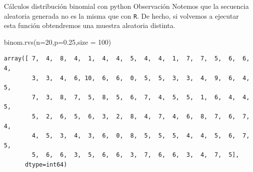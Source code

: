 \documentclass[
  ignorenonframetext,
  aspectratio=169]{beamer}
\newenvironment{Shaded}{\begin{snugshade}}{\end{snugshade}}
\newcommand{\DecValTok}[1]{\textcolor[rgb]{0.68,0.00,0.00}{#1}}
\newcommand{\FloatTok}[1]{\textcolor[rgb]{0.68,0.00,0.00}{#1}}
\newcommand{\NormalTok}[1]{\textcolor[rgb]{0.00,0.23,0.31}{#1}}
\newcommand{\OperatorTok}[1]{\textcolor[rgb]{0.37,0.37,0.37}{#1}}
\begin{document}
\begin{frame}[fragile]{Cálculos distribución binomial con python}
\protect\hypertarget{cuxe1lculos-distribuciuxf3n-binomial-con-python-4}{}
Observación Notemos que la secuencia aleatoria generada no es la misma
que con \texttt{R}. De hecho, si volvemos a ejecutar esta función
obtendremos una muestra aleatoria distinta.

\begin{Shaded}
\begin{Highlighting}[]
\NormalTok{binom.rvs(n}\OperatorTok{=}\DecValTok{20}\NormalTok{,p}\OperatorTok{=}\FloatTok{0.25}\NormalTok{,size }\OperatorTok{=} \DecValTok{100}\NormalTok{)}
\end{Highlighting}
\end{Shaded}

\begin{verbatim}
array([ 7,  4,  8,  4,  1,  4,  4,  5,  4,  4,  1,  7,  7,  5,  6,  6,  4,
        3,  3,  4,  6, 10,  6,  6,  0,  5,  5,  3,  3,  4,  9,  6,  4,  5,
        7,  3,  8,  7,  5,  8,  5,  6,  7,  4,  5,  5,  1,  6,  4,  4,  5,
        5,  2,  6,  5,  6,  3,  2,  8,  4,  7,  4,  6,  8,  7,  6,  7,  4,
        4,  5,  3,  4,  3,  6,  0,  8,  5,  5,  5,  4,  4,  5,  6,  7,  5,
        5,  6,  6,  3,  5,  6,  6,  3,  7,  6,  6,  3,  4,  7,  5],
      dtype=int64)
\end{verbatim}
\end{frame}
\end{document}
